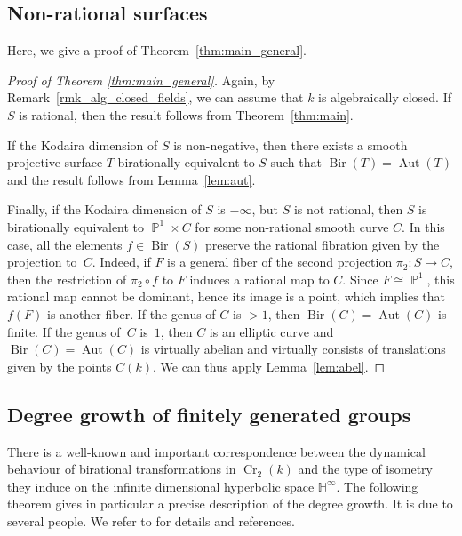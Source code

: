 \documentclass[11pt]{article}
\numberwithin{equation}{section}
\newcommand{\p}{\operatorname{\mathbb{P}}}\let\P\p
\newcommand{\h}{\operatorname{\mathbb{H}^{\infty}}}
\newcommand{\kk}{k}
\newcommand{\Aut}{\operatorname{Aut}}
\newcommand{\Bir}{\operatorname{Bir}}
\newcommand{\Cr}{\operatorname{Cr}}
\theoremstyle{plain}
\theoremstyle{definition}
\begin{document}
\subsection{Non-rational surfaces}\label{sec:remarks}
Here, we give a proof of Theorem~\ref{thm:main_general}.

\begin{proof}[Proof of Theorem \ref{thm:main_general}]
{Again, by Remark~\ref{rmk_alg_closed_fields}, we can assume that $k$ is algebraically closed}.
If $S$ is rational, then the result follows from Theorem~\ref{thm:main}.

If the Kodaira dimension of $S$ is non-negative, then there exists a smooth projective surface $T$ birationally equivalent to $S$ such that $\Bir(T)=\Aut(T)$ and the result follows from Lemma~\ref{lem:aut}.

Finally, if the Kodaira dimension of $S$ is $-\infty$, but $S$ is not rational, then $S$ is birationally equivalent to $\p^1\times C$ for some non-rational smooth curve $C$. In this case, all the elements $f\in\Bir(S)$ preserve the rational fibration given by the projection to~$C$. {Indeed, if $F$ is a general fiber of the second projection $\pi_2\colon S\to C$, then the restriction of $\pi_2\circ f$ to $F$ induces a rational map to $C$. Since $F\cong \p^1$, this rational map cannot be dominant, hence its image is a point, which implies that $f(F)$ is another fiber.} If the genus of $C$ is $>1$, then $\Bir(C)=\Aut(C)$ is finite. If the genus of~$C$ is~$1$, then $C$ is an elliptic curve and $\Bir(C)=\Aut(C)$ is virtually abelian and virtually consists of translations given by the points $C(\kk)$. We can thus apply Lemma~\ref{lem:abel}.
\end{proof}

\subsection{Degree growth of finitely generated groups}\label{sec:degrees}

There is a well-known and important correspondence between the dynamical behaviour of birational transformations in $\Cr_2(k)$ and the type of isometry they induce on the infinite dimensional hyperbolic space $\h$. The following theorem gives in particular a precise description of the degree growth. It is due to several people. We refer to \cite{cantat2015cremona} for details and references.
\end{document}
